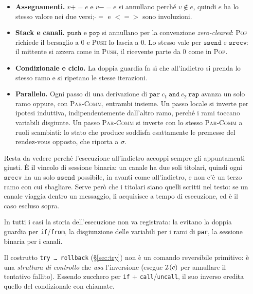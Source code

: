 \begin{itemize}
  \item \textbf{Assegnamenti.} $v \mathbin{+\!\!=} e$ e $v \mathbin{-\!\!=} e$ si
    annullano perché $v \notin e$, quindi $e$ ha lo stesso valore nei due versi;
    $\mathbin{\hat{}\!=}$ e $\mathbin{<\!=\!>}$ sono involuzioni.
  \item \textbf{Stack e canali.} $\mathtt{push}$ e $\mathtt{pop}$ si annullano per
    la convenzione \emph{zero-cleared}: \textsc{Pop} richiede il bersaglio a $0$ e
    \textsc{Push} lo lascia a $0$. Lo stesso vale per $\mathtt{ssend}$ e
    $\mathtt{srecv}$: il mittente si azzera come in \textsc{Push}, il ricevente
    parte da $0$ come in \textsc{Pop}.
  \item \textbf{Condizionale e ciclo.} La doppia guardia fa sì che all'indietro
    si prenda lo stesso ramo e si ripetano le stesse iterazioni.
  \item \textbf{Parallelo.} Ogni passo di una derivazione di
    $\mathtt{par}\ c_1\ \mathtt{and}\ c_2\ \mathtt{rap}$ avanza un solo ramo
    oppure, con \textsc{Par-Comm}, entrambi insieme. Un passo locale si inverte
    per ipotesi induttiva, indipendentemente dall'altro ramo, perché i rami
    toccano variabili disgiunte. Un passo \textsc{Par-Comm} si inverte con lo
    stesso \textsc{Par-Comm} a ruoli scambiati: lo stato che produce soddisfa
    esattamente le premesse del rendez-vous opposto, che riporta a $\sigma$.
\end{itemize}

\noindent
Resta da vedere perché l'esecuzione all'indietro accoppi sempre gli
appuntamenti giusti. È il vincolo di sessione binaria: un canale ha due soli
titolari, quindi ogni $\mathtt{srecv}$ ha un solo $\mathtt{ssend}$ possibile, in
avanti come all'indietro, e non c'è un terzo ramo con cui sbagliare. Serve però
che i titolari siano quelli scritti nel testo: se un canale viaggia dentro un
messaggio, li acquisisce a tempo di esecuzione, ed è il caso escluso sopra.

In tutti i casi la storia dell'esecuzione non va registrata: la evitano la
doppia guardia per \texttt{if}/\texttt{from}, la disgiunzione delle variabili
per i rami di \texttt{par}, la sessione binaria per i canali.

\medskip
\noindent
Il costrutto \texttt{try\,\dots\,rollback} (\S\ref{sec:try}) non è un comando
reversibile primitivo: è una \emph{struttura di controllo} che \emph{usa}
l'inversione (esegue $\mathcal{I}(c)$ per annullare il tentativo fallito). Essendo
zucchero per \texttt{if} + \texttt{call}/\texttt{uncall}, il suo inverso eredita
quello del condizionale con chiamate.

